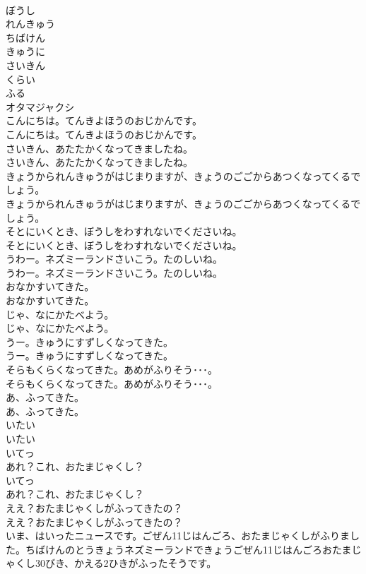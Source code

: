 \documentclass[8pt]{extreport}
\begin{document}
\begin{CJK}{UTF8}{min}
\\	ぼうし
\\	れんきゅう
\\	ちばけん
\\	きゅうに
\\	さいきん
\\	くらい
\\	ふる
\\	オタマジャクシ
\\	こんにちは。てんきよほうのおじかんです。
\\	こんにちは。てんきよほうのおじかんです。
\\	さいきん、あたたかくなってきましたね。
\\	さいきん、あたたかくなってきましたね。
\\	きょうかられんきゅうがはじまりますが、きょうのごごからあつくなってくるでしょう。
\\	きょうかられんきゅうがはじまりますが、きょうのごごからあつくなってくるでしょう。
\\	そとにいくとき、ぼうしをわすれないでくださいね。
\\	そとにいくとき、ぼうしをわすれないでくださいね。
\\	うわー。ネズミーランドさいこう。たのしいね。
\\	うわー。ネズミーランドさいこう。たのしいね。
\\	おなかすいてきた。
\\	おなかすいてきた。
\\	じゃ、なにかたべよう。
\\	じゃ、なにかたべよう。
\\	うー。きゅうにすずしくなってきた。
\\	うー。きゅうにすずしくなってきた。
\\	そらもくらくなってきた。あめがふりそう･･･。
\\	そらもくらくなってきた。あめがふりそう･･･。
\\	あ、ふってきた。
\\	あ、ふってきた。
\\	いたい
\\	いたい
\\	いてっ
\\	あれ？これ、おたまじゃくし？
\\	いてっ
\\	あれ？これ、おたまじゃくし？
\\	ええ？おたまじゃくしがふってきたの？
\\	ええ？おたまじゃくしがふってきたの？
\\	いま、はいったニュースです。ごぜん11じはんごろ、おたまじゃくしがふりました。ちばけんのとうきょうネズミーランドできょうごぜん11じはんごろおたまじゃくし30びき、かえる2ひきがふったそうです。

\end{CJK}
\end{document}
